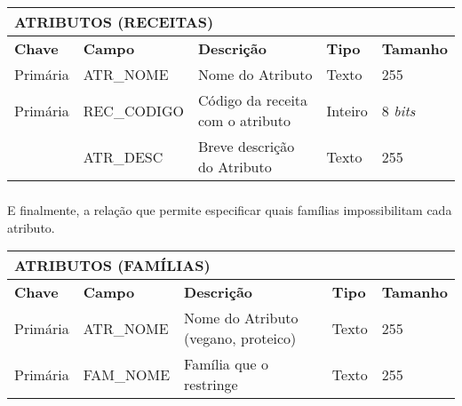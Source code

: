 \documentclass[paper=a4, fontsize=11pt]{scrartcl}	%
\numberwithin{equation}{section}															%
\numberwithin{figure}{section}																%
\numberwithin{table}{section}																%
\begin{document}
\begin{center}
\begin{tabular}{ l  l  l  l l }
  \multicolumn{5}{l}{\textbf{ATRIBUTOS (RECEITAS)}} \\
  \hline
  \textbf{Chave} & \textbf{Campo} & \textbf{Descrição} & \textbf{Tipo} & \textbf{Tamanho} \\
  \cline{1-5}
  Primária & ATR\_NOME & Nome do Atributo & Texto & 255 \\
  Primária & REC\_CODIGO & Código da receita com o atributo & Inteiro & 8 \emph{bits} \\
   & ATR\_DESC & Breve descrição do Atributo & Texto & 255
\end{tabular}
\end{center}

\vspace{5mm}

\subsubsection{} E finalmente, a relação que permite especificar quais famílias impossibilitam cada atributo.

\begin{center}
\begin{tabular}{ l  l  l  l l }
  \multicolumn{5}{l}{\textbf{ATRIBUTOS (FAMÍLIAS)}} \\
  \hline
  \textbf{Chave} & \textbf{Campo} & \textbf{Descrição} & \textbf{Tipo} & \textbf{Tamanho} \\
  \cline{1-5}
  Primária & ATR\_NOME & Nome do Atributo (vegano, proteico) & Texto & 255 \\
  Primária & FAM\_NOME & Família que o restringe & Texto & 255
\end{tabular}
\end{center}
\end{document}
